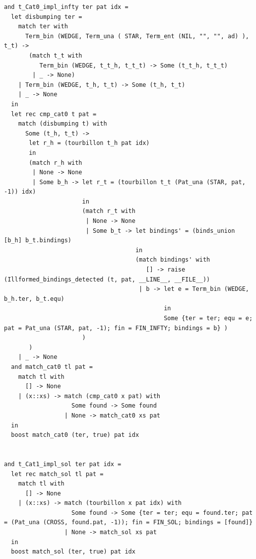\documentclass[12pt]{article}
\begin{document}
\begin{tiny}
\begin{verbatim}
and t_Cat0_impl_infty ter pat idx =
  let disbumping ter =
    match ter with
      Term_bin (WEDGE, Term_una ( STAR, Term_ent (NIL, "", "", ad) ), t_t) ->
       (match t_t with
          Term_bin (WEDGE, t_t_h, t_t_t) -> Some (t_t_h, t_t_t)
        | _ -> None)
    | Term_bin (WEDGE, t_h, t_t) -> Some (t_h, t_t)
    | _ -> None
  in
  let rec cmp_cat0 t pat =
    match (disbumping t) with
      Some (t_h, t_t) ->
       let r_h = (tourbillon t_h pat idx)
       in
       (match r_h with
        | None -> None
        | Some b_h -> let r_t = (tourbillon t_t (Pat_una (STAR, pat, -1)) idx)
                      in
                      (match r_t with
                       | None -> None
                       | Some b_t -> let bindings' = (binds_union [b_h] b_t.bindings)
                                     in
                                     (match bindings' with
                                        [] -> raise (Illformed_bindings_detected (t, pat, __LINE__, __FILE__))
                                      | b -> let e = Term_bin (WEDGE, b_h.ter, b_t.equ)
                                             in
                                             Some {ter = ter; equ = e; pat = Pat_una (STAR, pat, -1); fin = FIN_INFTY; bindings = b} )
                      )
       )
    | _ -> None
  and match_cat0 tl pat =
    match tl with
      [] -> None
    | (x::xs) -> match (cmp_cat0 x pat) with
                   Some found -> Some found
                 | None -> match_cat0 xs pat
  in
  boost match_cat0 (ter, true) pat idx


and t_Cat1_impl_sol ter pat idx =
  let rec match_sol tl pat =
    match tl with
      [] -> None
    | (x::xs) -> match (tourbillon x pat idx) with
                   Some found -> Some {ter = ter; equ = found.ter; pat = (Pat_una (CROSS, found.pat, -1)); fin = FIN_SOL; bindings = [found]}
                 | None -> match_sol xs pat
  in
  boost match_sol (ter, true) pat idx



\end{verbatim}
\end{tiny}
\end{document}
